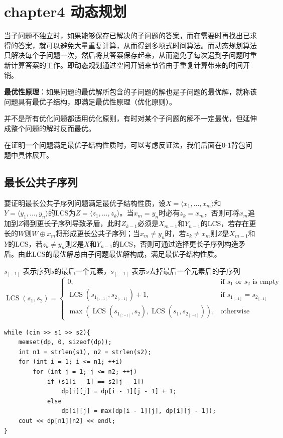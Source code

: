 \documentclass[./../main.tex]{subfiles}
\begin{document}
\section{chapter4 动态规划}
当子问题不独立时，如果能够保存已解决的子问题的答案，而在需要时再找出已求得的答案，就可以避免大量重复计算，从而得到多项式时间算法。而动态规划算法只解决每个子问题一次，然后将其答案保存起来，从而避免了每次遇到子问题时重新计算答案的工作。即动态规划通过空间开销来节省由于重复计算带来的时间开销。

\textbf{最优性原理}：如果问题的最优解所包含的子问题的解也是子问题的最优解，就称该问题具有最优子结构，即满足最优性原理（优化原则）。

并不是所有优化问题都适用优化原则，有时对某个子问题的解不一定最优，但延伸成整个问题的解时反而最优。

在证明一个问题满足最优子结构性质时，可以考虑反证法，我们后面在0-1背包问题中具体展开。

\subsection{最长公共子序列}
要证明最长公共子序列问题满足最优子结构性质，设$X=\langle x_1,\ldots,x_m \rangle$和$Y=\langle y_1,\ldots,y_n \rangle$的LCS为$Z=\langle z_1,\ldots,z_k \rangle$。当$x_m = y_n$时必有$z_k = x_m$，否则可将$x_m$追加到$Z$得到更长子序列导致矛盾，此时$Z_{k-1}$必须是$X_{m-1}$和$Y_{n-1}$的LCS，若存在更长的$W$则$W \oplus x_m$将形成更长公共子序列；当$x_m \neq y_n$时，若$z_k \neq x_m$则$Z$是$X_{m-1}$和$Y$的LCS，若$z_k \neq y_n$则$Z$是$X$和$Y_{n-1}$的LCS，否则可通过选择更长子序列构造矛盾。由此LCS的最优解总由子问题最优解构成，满足最优子结构性质。

$s_{[-1]}$ 表示序列$s$的最后一个元素，$s_{[:-1]}$ 表示$s$去掉最后一个元素后的子序列
$$
\operatorname{LCS}\left(s_{1}, s_{2}\right)=
\begin{cases} 
0, & \text{if } s_{1} \text{ or } s_{2} \text{ is empty} \\
\operatorname{LCS}\left(s_{1_{[:-1]}}, s_{2_{[:-1]}}\right) + 1, & \text{if } s_{1_{[-1]}} = s_{2_{[-1]}} \\
\max\left(
    \operatorname{LCS}\left(s_{1_{[:-1]}}, s_{2}\right),
    \operatorname{LCS}\left(s_{1}, s_{2_{[:-1]}}\right)
\right), & \text{otherwise}
\end{cases}
$$

\begin{lstlisting}
while (cin >> s1 >> s2){
    memset(dp, 0, sizeof(dp));
    int n1 = strlen(s1), n2 = strlen(s2);
    for (int i = 1; i <= n1; ++i)
        for (int j = 1; j <= n2; ++j)
            if (s1[i - 1] == s2[j - 1])
                dp[i][j] = dp[i - 1][j - 1] + 1;
            else
                dp[i][j] = max(dp[i - 1][j], dp[i][j - 1]);
    cout << dp[n1][n2] << endl;
}
\end{lstlisting}
\end{document}
